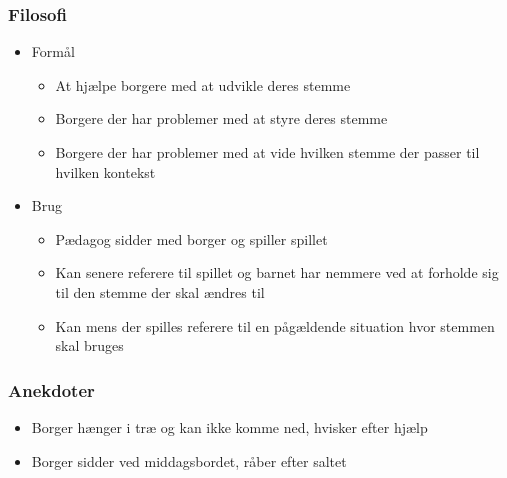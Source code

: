 \begin{frame}
\frametitle{Filosofi}

\begin{itemize}
\item Formål
\begin{itemize}
\item At hjælpe borgere med at udvikle deres stemme
\item Borgere der har problemer med at styre deres stemme
\item Borgere der har problemer med at vide hvilken stemme der passer til hvilken kontekst
\end{itemize}
\item Brug
\begin{itemize}
\item Pædagog sidder med borger og spiller spillet
\item Kan senere referere til spillet og barnet har nemmere ved at forholde sig til den stemme der skal ændres til
\item Kan mens der spilles referere til en pågældende situation hvor stemmen skal bruges
\end{itemize}
\end{itemize}

\end{frame}

\begin{frame}
\frametitle{Anekdoter}

\begin{itemize}
\item Borger hænger i træ og kan ikke komme ned, hvisker efter hjælp
\item Borger sidder ved middagsbordet, råber efter saltet
\end{itemize}

\end{frame}

